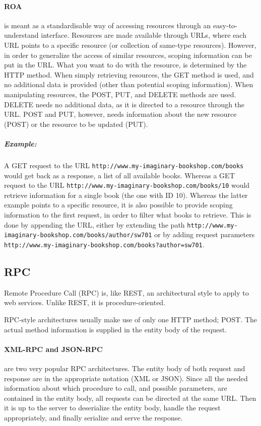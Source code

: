 \paragraph{ROA} is meant as a standardisable way of accessing resources through an easy-to-understand interface.
Resources are made available through URLs, where each URL points to a specific resource (or collection of same-type resources).
However, in order to generalize the access of similar resources, scoping information can be put in the URL.
What you want to do with the resource, is determined by the HTTP method.
When simply retrieving resources, the GET method is used, and no additional data is provided (other than potential scoping information).
When manipulating resources, the POST, PUT, and DELETE methods are used.
DELETE needs no additional data, as it is directed to a resource through the URL.
POST and PUT, however, needs information about the new resource (POST) or the resource to be updated (PUT).
\subparagraph{Example:} A GET request to the URL \texttt{http://www.my-imaginary-bookshop.com/books} would get back as a response, a list of all available books.
Whereas a GET request to the URL \texttt{http://www.my-imaginary-bookshop.com/books/10} would retrieve information for a single book (the one with ID  10).
Whereas the latter example points to a specific resource, it is also possible to provide scoping information to the first request, in order to filter what books to retrieve.
This is done by appending the URL, either by extending the path \texttt{http://www.my-imaginary-bookshop.com/books/author/sw701} or by adding request parameters \texttt{http://www.my-imaginary-bookshop.com/books?author=sw701}.

\subsection{RPC}
Remote Procedure Call (RPC) is, like REST, an architectural style to apply to web services.
Unlike REST, it is procedure-oriented.

RPC-style architectures usually make use of only one HTTP method; POST.
The actual method information is supplied in the entity body of the request.

\paragraph{XML-RPC and JSON-RPC} are two very popular RPC architectures.
The entity body of both request and response are in the appropriate notation (XML or JSON).
Since all the needed information about which procedure to call, and possible parameters, are contained in the entity body, all requests can be directed at the same URL.
Then it is up to the server to deserialize the entity body, handle the request appropriately, and finally serialize and serve the response.

